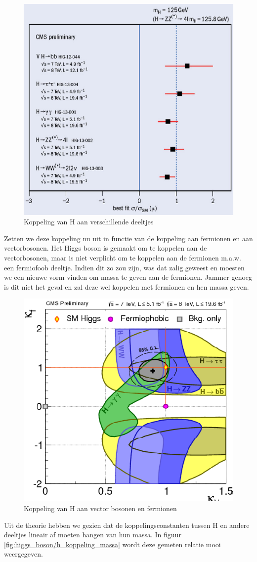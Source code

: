 \documentclass[../main.tex]{subfiles}
\begin{document}
\begin{figure}[h]
    \centering
    \includegraphics[width=0.5\linewidth]{higgs_boson/h_koppeling.png}
    \caption{Koppeling van H aan verschillende deeltjes}%
    \label{fig:higgs_boson/h_koppeling}
\end{figure}

Zetten we deze koppeling nu uit in functie van de koppeling aan fermionen en aan vectorbosonen. Het Higgs boson is gemaakt om te koppelen aan de vectorbosonen, maar is niet verplicht om te koppelen aan de fermionen m.a.w. een fermiofoob deeltje. Indien dit zo zou zijn, was dat zalig geweest en moesten we een nieuwe vorm vinden om massa te geven aan de fermionen. Jammer genoeg is dit niet het geval en zal deze wel koppelen met fermionen en hen massa geven.

\begin{figure}[h]
    \centering
    \includegraphics[width=0.5\linewidth]{higgs_boson/k_koppeling_vec_ferm.png}
    \caption{Koppeling van H aan vector bosonen en fermionen}%
    \label{fig:higgs_boson/k_koppeling_vec_ferm}
\end{figure}

Uit de theorie hebben we gezien dat de koppelingsconstanten tussen H en andere deeltjes lineair af moeten hangen van hun massa. In figuur \ref{fig:higgs_boson/h_koppeling_massa} wordt deze gemeten relatie mooi weergegeven.
\end{document}
